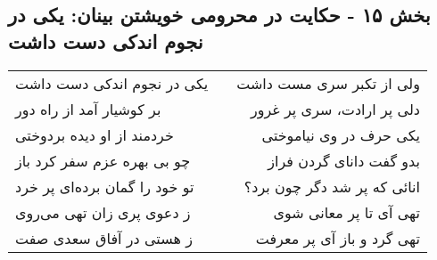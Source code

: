 \begin{center}
\section*{بخش ۱۵ - حکایت در محرومی خویشتن بینان: یکی در نجوم اندکی دست داشت}
\label{sec:015}
\begin{longtable}{l p{0.5cm} r}
یکی در نجوم اندکی دست داشت
&&
ولی از تکبر سری مست داشت
\\
بر کوشیار آمد از راه دور
&&
دلی پر ارادت، سری پر غرور
\\
خردمند از او دیده بردوختی
&&
یکی حرف در وی نیاموختی
\\
چو بی بهره عزم سفر کرد باز
&&
بدو گفت دانای گردن فراز
\\
تو خود را گمان برده‌ای پر خرد
&&
انائی که پر شد دگر چون برد؟
\\
ز دعوی پری زان تهی می‌روی
&&
تهی آی تا پر معانی شوی
\\
ز هستی در آفاق سعدی صفت
&&
تهی گرد و باز آی پر معرفت
\\
\end{longtable}
\end{center}
